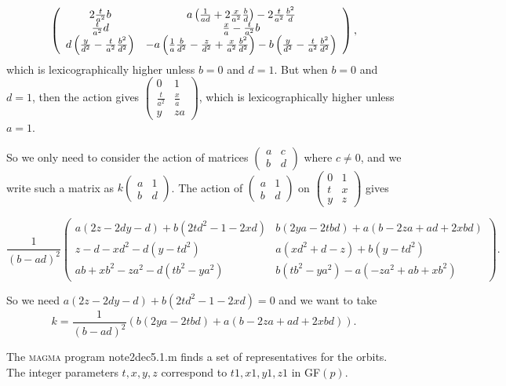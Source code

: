 \documentclass[12pt]{article}
\begin{document}
\[
\allowbreak \left( 
\begin{array}{cc}
2\frac{t}{a^{2}}b & a\left( \frac{1}{ad}+2\frac{x}{a^{2}}\frac{b}{d}\right)
-2\frac{t}{a^{2}}\frac{b^{2}}{d} \\ 
\frac{t}{a^{2}}d & \frac{x}{a}-\frac{t}{a^{2}}b \\ 
d\left( \frac{y}{d^{2}}-\frac{t}{a^{2}}\frac{b^{2}}{d^{2}}\right)  & 
-a\left( \frac{1}{a}\frac{b}{d^{2}}-\frac{z}{d^{2}}+\frac{x}{a^{2}}\frac{%
b^{2}}{d^{2}}\right) -b\left( \frac{y}{d^{2}}-\frac{t}{a^{2}}\frac{b^{2}}{%
d^{2}}\right) 
\end{array}%
\right) ,
\]%
which is lexicographically higher unless $b=0$ and $d=1$. But when $b=0$ and 
$d=1$, then the action gives $\allowbreak \left( 
\begin{array}{cc}
0 & 1 \\ 
\frac{t}{a^{2}} & \frac{x}{a} \\ 
y & za%
\end{array}%
\right) $, which is lexicographically higher unless $a=1$.

So we only need to consider the action of matrices $\left( 
\begin{array}{ll}
a & c \\ 
b & d%
\end{array}%
\right) $ where $c\neq 0$, and we write such a matrix as $k\left( 
\begin{array}{ll}
a & 1 \\ 
b & d%
\end{array}%
\right) $. The action of $\left( 
\begin{array}{ll}
a & 1 \\ 
b & d%
\end{array}%
\right) $ on $\left( 
\begin{array}{ll}
0 & 1 \\ 
t & x \\ 
y & z%
\end{array}%
\right) $ gives

\[
\allowbreak \frac{1}{\left( b-ad\right) ^{2}}\left( 
\begin{array}{cc}
a(2z-2dy-d)+b(2td^{2}-1-2xd) & b\left( 2ya-2tbd\right) +a\left(
b-2za+ad+2xbd\right)  \\ 
z-d-xd^{2}-d\left( y-td^{2}\right)  & a\left( xd^{2}+d-z\right) +b\left(
y-td^{2}\right)  \\ 
ab+xb^{2}-za^{2}-d\left( tb^{2}-ya^{2}\right)  & b\left(
tb^{2}-ya^{2}\right) -a\left( -za^{2}+ab+xb^{2}\right) 
\end{array}%
\right) .
\]%
$\allowbreak \allowbreak $

So we need $a(2z-2dy-d)+b(2td^{2}-1-2xd)=0$ and we want to take%
\[
k=\allowbreak \frac{1}{\left( b-ad\right) ^{2}}\left( b\left(
2ya-2tbd\right) +a\left( b-2za+ad+2xbd\right) \right) .
\]

The \textsc{magma} program note2dec5.1.m finds a set of representatives for
the orbits. The integer parameters $t,x,y,z$ correspond to $t1,x1,y1,z1$ in
GF$(p)$.
\end{document}
